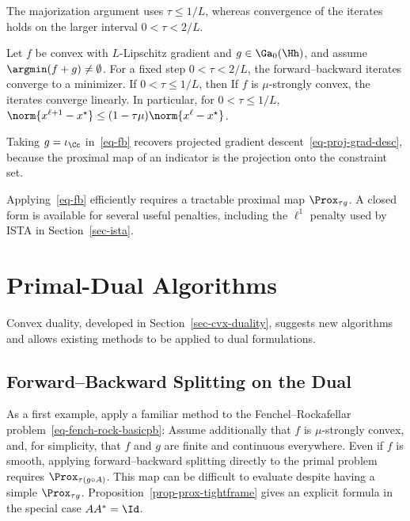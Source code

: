 The majorization argument uses $\tau\leq1/L$, whereas convergence of the iterates holds on the larger interval $0<\tau<2/L$.

\begin{thm}\label{thm-fb-conv}
Let $f$ be convex with $L$-Lipschitz gradient and $g\in\Ga_0(\Hh)$, and assume $\argmin(f+g)\neq\emptyset$. For a fixed step $0<\tau<2/L$, the forward--backward iterates converge to a minimizer. If $0<\tau\leq1/L$, then
If $f$ is $\mu$-strongly convex, the iterates converge linearly. In particular, for $0<\tau\leq1/L$,
$\norm{x^{\ell+1}-x^\star}\leq(1-\tau\mu)\norm{x^\ell-x^\star}$.
\end{thm}

Taking $g=\iota_{\Cc}$ in~\eqref{eq-fb} recovers projected gradient descent~\eqref{eq-proj-grad-desc}, because the proximal map of an indicator is the projection onto the constraint set.

Applying~\eqref{eq-fb} efficiently requires a tractable proximal map $\Prox_{\tau g}$. A closed form is available for several useful penalties, including the $\ell^1$ penalty used by ISTA in Section~\ref{sec-ista}.



\section{Primal-Dual Algorithms}

Convex duality, developed in Section~\ref{sec-cvx-duality}, suggests new algorithms and allows existing methods to be applied to dual formulations.

\subsection{Forward--Backward Splitting on the Dual}
\label{sec-fb-dual}

As a first example, apply a familiar method to the Fenchel--Rockafellar problem~\eqref{eq-fench-rock-basicpb}:
Assume additionally that $f$ is $\mu$-strongly convex, and, for simplicity, that $f$ and $g$ are finite and continuous everywhere. Even if $f$ is smooth, applying forward--backward splitting directly to the primal problem requires $\Prox_{\tau(g\circ A)}$. This map can be difficult to evaluate despite having a simple $\Prox_{\tau g}$. Proposition~\ref{prop-prox-tightframe} gives an explicit formula in the special case $AA^*=\Id$.


